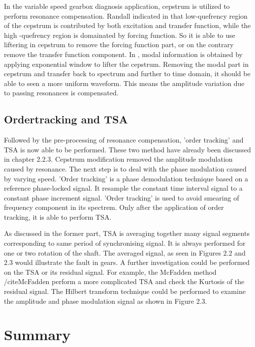 In the variable speed gearbox diagnosis application, cepstrum is utilized to perform resonance compensation. Randall indicated in \cite{resonance} that low-quefrency region of the cepstrum is contributed by both excitation and transfer function, while the high -quefrency region is domainated by forcing function. So it is able to use liftering in cepstrum to remove the forcing function part, or on the contrary remove the transfer function component. In \cite{varyspeed}, modal information is obtained by applying exponential window  to lifter the cepstrum. Removing the modal part in cepstrum and transfer back to spectrum and further to time domain, it should be able to seen a more uniform waveform. This means the amplitude variation due to passing resonances is compensated.

\subsection{Ordertracking and TSA}

Followed by the pre-processing of resonance compensation, 'order tracking' and TSA is now able to be performed. These two method have already been discussed in chapter 2.2.3. Cepstrum modification removed the amplitude modulation caused by resonance. The next step is to deal with the phase modulation caused by varying speed. 'Order tracking' is a phase demodulation technique based on a reference phase-locked signal. It resample the constant time interval signal to a constant phase increment signal. 'Order tracking' is used to avoid smearing of frequency component in its spectrem. Only after the application of order tracking, it is able to perform TSA.

As discussed in the former part, TSA is averaging together many signal segments corresponding to same period of synchronising signal. It is always performed for one or two rotation of the shaft. The averaged signal, as seen in Figures 2.2 and 2.3 would illustrate the fault in gears. A further investigation could be performed on the TSA or its residual signal. For example, the McFadden method /cite{McFadden} perform a more complicated TSA and check the Kurtosis of the residual signal. The Hilbert transform technique \cite{mc4} could be performed to examine the amplitude and phase modulation signal as shown in Figure 2.3.

\section{Summary}

